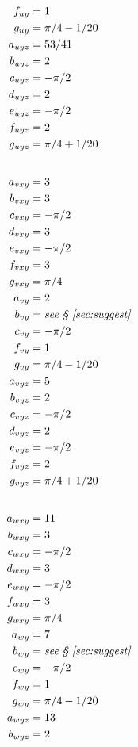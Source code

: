\documentclass[10pt,reqno]{amsart}
\begin{document}
\begin{table}[p]
\begin{multicols}{3}
\begin{small}
\begin{align*}
f_{uy} &= 1 \\
g_{uy} &= \pi / 4 - 1 / 20 \\
a_{uyz} &= 53 / 41 \\
b_{uyz} &= 2 \\
c_{uyz} &= - \pi / 2 \\
d_{uyz} &= 2 \\
e_{uyz} &= - \pi / 2 \\
f_{uyz} &= 2 \\
g_{uyz} &= \pi / 4 + 1 / 20 \\
\intertext{}
a_{vxy} &= 3 \\
b_{vxy} &= 3 \\
c_{vxy} & = - \pi / 2 \\
d_{vxy} & = 3         \\
e_{vxy} & = - \pi / 2 \\
f_{vxy} &= 3 \\
g_{vxy} &= \pi / 4 \\
a_{vy} &= 2 \\
b_{vy} &= \text{\emph{see \textsection{}~\ref{sec:suggest}}} \\
c_{vy} &= - \pi / 2 \\
f_{vy} &= 1 \\
g_{vy} &= \pi / 4 - 1 / 20 \\
a_{vyz} &= 5 \\
b_{vyz} &= 2 \\
c_{vyz} &= -\pi / 2 \\
d_{vyz} &= 2 \\
e_{vyz} &= -\pi / 2 \\
f_{vyz} &= 2 \\
g_{vyz} &= \pi / 4 + 1 / 20 \\
\intertext{}
a_{wxy} &= 11 \\
b_{wxy} &= 3 \\
c_{wxy} &= -\pi / 2 \\
d_{wxy} &= 3 \\
e_{wxy} &= -\pi / 2 \\
f_{wxy} &= 3 \\
g_{wxy} &= \pi / 4 \\
a_{wy} &= 7 \\
b_{wy} &= \text{\emph{see \textsection{}~\ref{sec:suggest}}} \\
c_{wy} &= - \pi / 2 \\
f_{wy} &= 1 \\
g_{wy} &= \pi / 4 - 1 / 20 \\
a_{wyz} &= 13 \\
b_{wyz} &= 2 \\

\end{align*}
\end{small}
\end{multicols}
\end{table}
\end{document}
